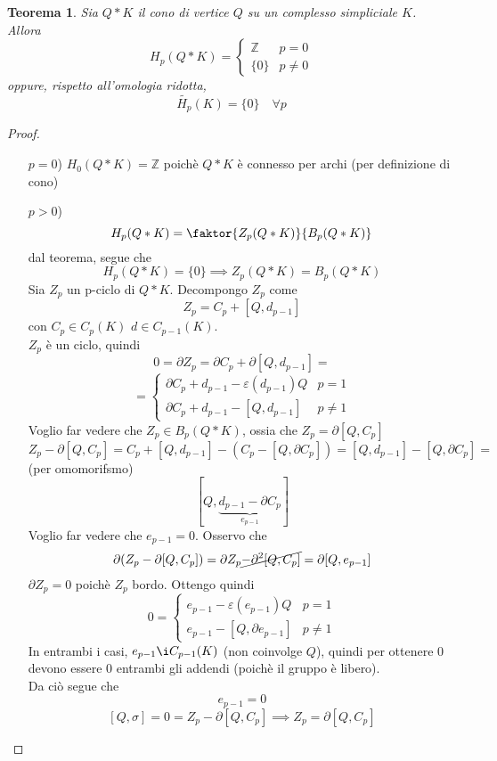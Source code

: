 \documentclass[a4paper]{report}
\newtheorem{theorem}{Teorema}
\newcommand{\Z}{\ensuremath{\mathbb{Z}}}
\begin{document}
\begin{theorem}
    Sia $Q*K$ il cono di vertice $Q$ su un complesso simpliciale $K$.\\
    Allora
    \[
        H_p(Q*K)=\begin{cases}
            \Z    & p=0     \\
            \{0\} & p\neq 0
        \end{cases}
    \]
    oppure, rispetto all'omologia ridotta,
    \[
        \tilde{H_p}(K)=\{0\}\quad \forall p
    \]
\end{theorem}
\begin{proof}
    \begin{itemize}
        \item [$p=0$)] $H_0(Q*K)=\Z$ poichè $Q*K$ è connesso per archi (per definizione di cono)
        \item [$p>0$)]
              \[
                  H_p(Q*K)=\faktor{Z_p(Q*K)}{B_p(Q*K)}
              \]
              dal teorema, segue che
              \[
                  H_p(Q*K)=\{0\}\implies Z_p(Q*K)=B_p(Q*K)
              \]
              Sia $Z_p$ un p-ciclo di $Q*K$. Decompongo $Z_p$ come
              \[
                  Z_p=C_p+[Q,d_{p-1}]
              \]
              con $C_p\in C_p(K)$ $d\in C_{p-1}(K)$.\\
              $Z_p$ è un ciclo, quindi
              \[
                  0=\partial Z_p=\partial C_p+\partial[Q,d_{p-1}]=
              \]
              \[
                  =\begin{cases}
                      \partial C_p+d_{p-1}-\varepsilon(d_{p-1})Q & p=1     \\
                      \partial C_p+d_{p-1}-[Q,d_{p-1}]           & p\neq 1
                  \end{cases}
              \]
              Voglio far vedere che $Z_p\in B_p(Q*K)$, ossia che $Z_p=\partial[Q,C_p]$
              \[
                  Z_p-\partial[Q,C_p]=C_p+[Q,d_{p-1}]-(C_p-[Q,\partial C_p])=[Q,d_{p-1}]-[Q,\partial C_p]=
              \]
              (per omomorifsmo)
              \[
                  [Q,\underbrace{d_{p-1}-\partial C_p}_{e_{p-1}}]
              \]
              Voglio far vedere che $e_{p-1}=0$. Osservo che
              \[
                  \partial(Z_p-\partial[Q,C_p])=\partial Z_p\cancel{-\partial^2[Q,C_p]}=\partial[Q,e_{p-1}]
              \]
              $\partial Z_p=0$ poichè $Z_p$ bordo. Ottengo quindi
              \[
                  0=\begin{cases}
                      e_{p-1}-\varepsilon(e_{p-1})Q & p=1     \\
                      e_{p-1}-[Q,\partial e_{p-1}]  & p\neq 1
                  \end{cases}
              \]
              In entrambi i casi, $e_{p-1}\i C_{p-1}(K)$ (non coinvolge $Q$), quindi per ottenere $0$ devono essere 0 entrambi gli addendi (poichè il gruppo è libero).\\
              Da ciò segue che
              \[
                  e_{p-1}=0
              \]
              \[
                  [Q,\sigma]=0=Z_p-\partial[Q,C_p]\implies Z_p=\partial[Q,C_p]
              \]
    \end{itemize}
\end{proof}
\end{document}
